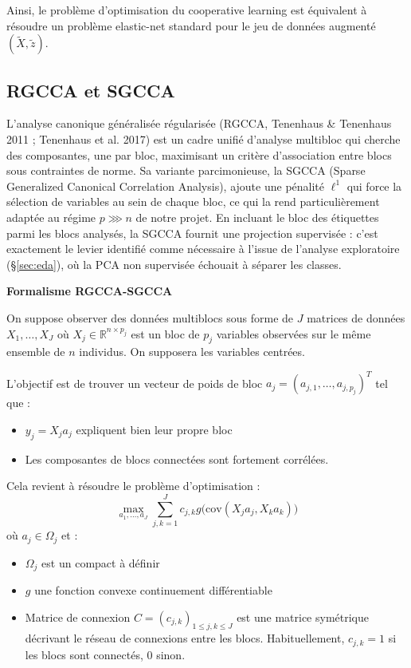 \documentclass[a4paper,11pt]{paper}
\theoremstyle{plain}
\theoremstyle{definition}
\theoremstyle{remark}
\begin{document}
Ainsi, le problème d'optimisation du cooperative learning est équivalent à résoudre un problème elastic-net standard pour le jeu de données augmenté $(\tilde X, \tilde z)$.

\subsection{RGCCA et SGCCA}

L'analyse canonique généralisée régularisée (RGCCA, Tenenhaus \& Tenenhaus 2011 ; Tenenhaus et al. 2017) est un cadre unifié d'analyse multibloc qui cherche des composantes, une par bloc, maximisant un critère d'association entre blocs sous contraintes de norme. Sa variante parcimonieuse, la SGCCA (Sparse Generalized Canonical Correlation Analysis), ajoute une pénalité $\ell^1$ qui force la sélection de variables au sein de chaque bloc, ce qui la rend particulièrement adaptée au régime $p \ggg n$ de notre projet. En incluant le bloc des étiquettes parmi les blocs analysés, la SGCCA fournit une projection supervisée : c'est exactement le levier identifié comme nécessaire à l'issue de l'analyse exploratoire (§\ref{sec:eda}), où la PCA non supervisée échouait à séparer les classes.

\begin{center}
    \Large \textbf{Formalisme RGCCA-SGCCA}
\end{center}

On suppose observer des données multiblocs sous forme de $J$ matrices de données $X_1, \dots, X_J$ où $X_j \in \mathbb R^{n \times p_j}$ est un bloc de $p_j$ variables observées sur le même ensemble de $n$ individus. On supposera les variables centrées.

L'objectif est de trouver un vecteur de poids de bloc $a_j = (a_{j,1}, \dots, a_{j, p_j})^T$ tel que :
\begin{itemize}
    \item $y_j = X_ja_j$ expliquent bien leur propre bloc
    \item Les composantes de blocs connectées sont fortement corrélées.
\end{itemize}

Cela revient à résoudre le problème d'optimisation :
\[ \max_{a_1, \dots, a_J} \sum_{j, k=1}^J c_{j,k} g\big( \text{cov}(X_ja_j, X_ka_k)\big) \tag{1}\]
où $a_j \in \Omega_j$ et :
\begin{itemize}
    \item $\Omega_j$ est un compact à définir
    \item $g$ une fonction convexe continuement différentiable
    \item Matrice de connexion $C = (c_{j,k})_{1 \leqslant j, k \leqslant J}$ est une matrice symétrique décrivant le réseau de connexions entre les blocs. Habituellement, $c_{j,k} = 1$ si les blocs sont connectés, $0$ sinon.
\end{itemize}
\end{document}
